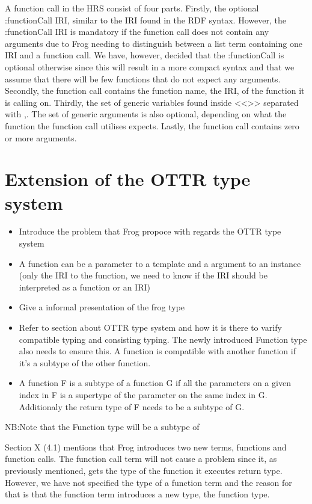 \para 
A function call in the HRS consist of four parts. Firstly, the optional :functionCall IRI,  similar to the IRI found in the RDF syntax. However, the :functionCall  IRI is mandatory if the function call does not contain any arguments due to Frog needing to distinguish between a list term containing one IRI and a function call. We have, however, decided that the :functionCall is optional otherwise since this will result in a more compact syntax and that we assume that there will be few functions that do not expect any arguments. Secondly, the function call contains the function name, the IRI, of the function it is calling on. Thirdly, the set of generic variables found inside <<>> separated with ,.  The set of generic arguments is also optional, depending on what the function the function call utilises expects. Lastly, the function call contains zero or more arguments.


\section{Extension of the OTTR type system}
\label{extension_ottr_type}
\begin{itemize}
    \item Introduce the problem that Frog propoce with regards the OTTR type system 
    \item A function can be a parameter to a template and a argument to an instance (only the IRI to the function, we need to know if the IRI should be interpreted as a function or an IRI)
    \item Give a informal presentation of the frog type 
    \item Refer to section about OTTR type system and how it is there to varify compatible typing and consisting typing. The newly introduced Function type also needs to ensure this. A function is compatible with  another function if it's a subtype of the other function.
    \item A function F is a subtype of a function G if all the parameters on a given index in F is a supertype of the parameter on the same index in G. Additionaly the return type of F needs to be a subtype of G.
\end{itemize}

NB:Note that the Function type will be a subtype of 

\para
Section X (4.1) mentions that Frog introduces two new terms, functions and function calls. The function call term will not cause a problem since it, as previously mentioned, gets the type of the function it executes return type. However, we have not specified the type of a function term and the reason for that is that the function term introduces a new type, the function type.  

